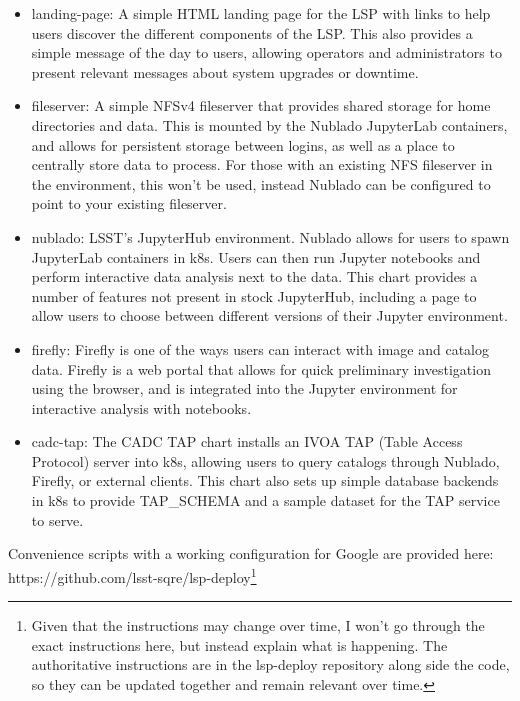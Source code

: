 \documentclass[11pt,twoside]{article}
\begin{document}
\begin{itemize}

\item landing-page: A simple HTML landing page for the LSP with links to help users
discover the different components of the LSP.  This also provides a simple message of
the day to users, allowing operators and administrators to present relevant
messages about system upgrades or downtime.

\item fileserver: A simple NFSv4 fileserver that provides shared storage for
home directories and data.  This is mounted by the Nublado JupyterLab containers,
and allows for persistent storage between logins, as well as a place to centrally
store data to process.  For those with an existing NFS fileserver in the environment,
this won't be used, instead Nublado can be configured to point to your existing
fileserver.

\item nublado: LSST's JupyterHub environment.  Nublado allows for users to spawn
JupyterLab containers in k8s.  Users can then run Jupyter notebooks and perform interactive
data analysis next to the data.  This chart provides a number of features not present
in stock JupyterHub, including a page to allow users to choose between different versions
of their Jupyter environment.

\item firefly: Firefly is one of the ways users can interact with image and catalog
data.  Firefly is a web portal that allows for quick preliminary
investigation using the browser, and is integrated into the Jupyter
environment for interactive analysis with notebooks.

\item cadc-tap: The CADC TAP chart installs an IVOA TAP (Table Access Protocol)
server into k8s, allowing users to query catalogs through Nublado, Firefly,
or external clients.  This chart also sets up simple database backends
in k8s to provide TAP\_SCHEMA and a sample dataset for the TAP service to serve.

\end{itemize}

Convenience scripts with a working configuration for Google are provided here:
https://github.com/lsst-sqre/lsp-deploy\footnote{Given that the instructions
may change over time, I won't go through the exact
instructions here, but instead explain what is happening.  The authoritative instructions
are in the lsp-deploy repository along side the code, so they can be updated together
and remain relevant over time.}
\end{document}
